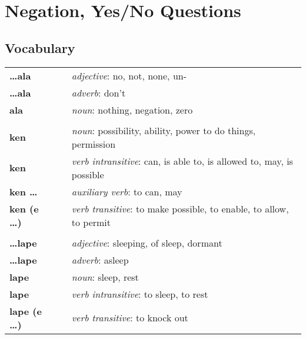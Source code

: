 
\section{Negation, Yes/No Questions}
\subsection*{Vocabulary}
\begin{supertabular}{p{2,5cm}|ll}
    \textbf{\dots ala}      &  & \textit{adjective}: no, not, none, un-                                       \\
    \textbf{\dots ala}      &  & \textit{adverb}: don't                                                       \\
    \textbf{ala}            &  & \textit{noun}: nothing, negation, zero                                       \\
                            &  &                                                                              \\
    \textbf{ken}            &  & \textit{noun}: possibility, ability, power to do things, permission          \\
    \textbf{ken}            &  & \textit{verb intransitive}: can, is able to, is allowed to, may, is possible \\
    \textbf{ken \dots}      &  & \textit{auxiliary verb}: to can, may                                         \\
    \textbf{ken (e \dots)}  &  & \textit{verb transitive}: to make possible, to enable, to allow, to permit   \\
                            &  &                                                                              \\
    \textbf{\dots lape}     &  & \textit{adjective}: sleeping, of sleep, dormant                              \\
    \textbf{\dots lape}     &  & \textit{adverb}: asleep                                                      \\
    \textbf{lape}           &  & \textit{noun}: sleep, rest                                                   \\
    \textbf{lape}           &  & \textit{verb intransitive}: to sleep, to rest                                \\
    \textbf{lape (e \dots)} &  & \textit{verb transitive}: to knock out                                       \\

\end{supertabular}
